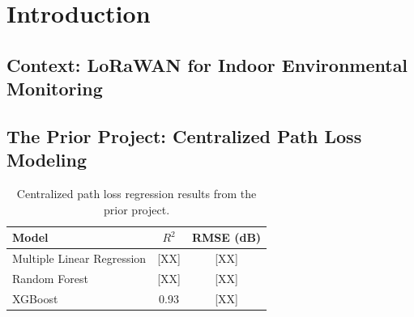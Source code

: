 \chapter{Introduction}
\label{ch:introduction}

\section{Context: LoRaWAN for Indoor Environmental Monitoring}
\label{sec:context}


\section{The Prior Project: Centralized Path Loss Modeling}
\label{sec:prior-project}


\begin{table}[H]
  \centering
  \begin{tabular}{lcc}
    \toprule
    \textbf{Model} & \textbf{$R^2$} & \textbf{RMSE (dB)} \\
    \midrule
    Multiple Linear Regression & [XX] & [XX] \\
    Random Forest              & [XX] & [XX] \\
    XGBoost                    & 0.93 & [XX] \\
    \bottomrule
  \end{tabular}
  \caption{Centralized path loss regression results from the prior project.}
  \label{tab:prior-results}
\end{table}

